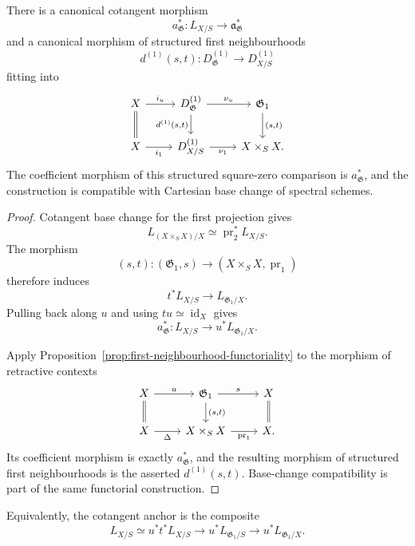 \begin{proposition}
\label{prop:first-order-source-target-comparison}
There is a canonical cotangent morphism
\[
    a_{\mathfrak G}^{*}:
    L_{X/S}\longrightarrow\mathfrak a_{\mathfrak G}^{*}
\]
and a canonical morphism of structured first neighbourhoods
\[
    d^{(1)}(s,t):
    D^{(1)}_{\mathfrak G}\longrightarrow D^{(1)}_{X/S}
\]
fitting into
\[
\begin{tikzcd}
X \arrow[r,"i_u"] \arrow[d,equal] &
D^{(1)}_{\mathfrak G}
    \arrow[r,"\nu_u"]
    \arrow[d,"{d^{(1)}(s,t)}"'] &
\mathfrak G_1
    \arrow[d,"{(s,t)}"]
\\
X \arrow[r,"i_1"'] &
D^{(1)}_{X/S}
    \arrow[r,"\nu_1"'] &
X\times_SX.
\end{tikzcd}
\]
The coefficient morphism of this structured square-zero comparison is
$a_{\mathfrak G}^{*}$, and the construction is compatible with Cartesian base change of spectral
schemes.
\end{proposition}

\begin{proof}
Cotangent base change for the first projection gives
\[
    L_{(X\times_SX)/X}
    \simeq
    \operatorname{pr}_2^*L_{X/S}.
\]
The morphism
\[
    (s,t):(\mathfrak G_1,s)
    \longrightarrow
    (X\times_SX,\operatorname{pr}_1)
\]
therefore induces
\[
    t^*L_{X/S}\longrightarrow L_{\mathfrak G_1/X}.
\]
Pulling back along $u$ and using $tu\simeq\operatorname{id}_X$ gives
\[
    a_{\mathfrak G}^{*}:
    L_{X/S}\longrightarrow u^*L_{\mathfrak G_1/X}.
\]

Apply Proposition~\ref{prop:first-neighbourhood-functoriality} to the
morphism of retractive contexts
\[
\begin{tikzcd}
X \arrow[r,"u"] \arrow[d,equal] &
\mathfrak G_1 \arrow[d,"{(s,t)}"] \arrow[r,"s"] & X \arrow[d,equal]\\
X \arrow[r,"\Delta"'] &
X\times_SX \arrow[r,"\operatorname{pr}_1"'] & X.
\end{tikzcd}
\]
Its coefficient morphism is exactly $a_{\mathfrak G}^{*}$, and the
resulting morphism of structured first neighbourhoods is the asserted
$d^{(1)}(s,t)$.  Base-change compatibility is part of the same functorial
construction.
\end{proof}

Equivalently, the cotangent anchor is the composite
\[
    L_{X/S}
    \simeq
    u^*t^*L_{X/S}
    \longrightarrow
    u^*L_{\mathfrak G_1/S}
    \longrightarrow
    u^*L_{\mathfrak G_1/X}.
\]


